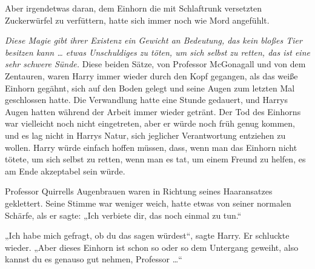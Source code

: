Aber irgendetwas daran, dem Einhorn die mit Schlaftrunk versetzten Zuckerwürfel zu verfüttern, hatte sich immer noch wie Mord angefühlt.

\emph{Diese Magie gibt ihrer Existenz ein Gewicht an Bedeutung, das kein bloßes Tier besitzen kann … etwas Unschuldiges zu töten, um sich selbst zu retten, das ist eine sehr schwere Sünde.}
Diese beiden Sätze, von Professor McGonagall und von dem Zentauren, waren Harry immer wieder durch den Kopf gegangen, als das weiße Einhorn gegähnt, sich auf den Boden gelegt und seine Augen zum letzten Mal geschlossen hatte. Die Verwandlung hatte eine Stunde gedauert, und Harrys Augen hatten während der Arbeit immer wieder getränt. Der Tod des Einhorns war vielleicht noch nicht eingetreten, aber er würde noch früh genug kommen, und es lag nicht in Harrys Natur, sich jeglicher Verantwortung entziehen zu wollen. Harry würde einfach hoffen müssen, dass, wenn man das Einhorn nicht tötete, um sich selbst zu retten, wenn man es tat, um einem Freund zu helfen, es am Ende akzeptabel sein würde.

Professor Quirrells Augenbrauen waren in Richtung seines Haaransatzes geklettert. Seine Stimme war weniger weich, hatte etwas von seiner normalen Schärfe, als er sagte:
„Ich verbiete dir, das noch einmal zu tun.“

„Ich habe mich gefragt, ob du das sagen würdest“, sagte Harry. Er schluckte wieder.
„Aber dieses Einhorn ist schon so oder so dem Untergang geweiht, also kannst du es genauso gut nehmen, Professor …“

